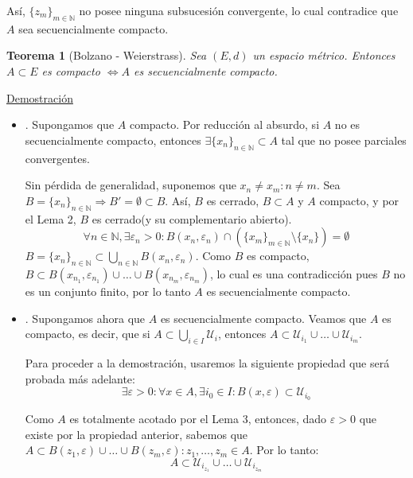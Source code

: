\documentclass[10pt,a4paper,openright]{book}
\theoremstyle{break}
\newtheorem*{theo}{Teorema}
\begin{document}
Así, $\{z_m\}_{m \in \mathbb{N}}$ no posee ninguna subsucesión convergente, lo cual contradice que $A$ sea secuencialmente compacto.

\begin{theo}[Bolzano - Weierstrass]
Sea $(E,d)$ un espacio métrico. Entonces $A \subset E$ es compacto $\Leftrightarrow A$ es secuencialmente compacto.
\end{theo}

\underline{Demostración}

\begin{itemize}
\item \fbox{$\Rightarrow$}. Supongamos que $A$ compacto. Por reducción al absurdo, si $A$ no es secuencialmente compacto, entonces $\exists \{x_n\}_{n \in \mathbb{N}} \subset A$ tal que no posee parciales convergentes.

Sin pérdida de generalidad, suponemos que $x_n \neq x_m : n \neq m$. Sea $B = \{x_n\}_{n \in \mathbb{N}} \Rightarrow B' = \emptyset \subset B$. Así, $B$ es cerrado, $B \subset A$ y $A$ compacto, y por el Lema 2, $B$ es cerrado(y su complementario abierto).
$$\forall n \in \mathbb{N}, \exists \varepsilon_n > 0 : B(x_n, \varepsilon_n) \cap \left( \{x_m\}_{m \in \mathbb{N}} \setminus \{x_n\}\right) = \emptyset$$
$B = \{x_n\}_{n \in \mathbb{N}}  \subset \bigcup_{n \in \mathbb{N}} B(x_n, \varepsilon_n)$. Como $B$ es compacto, $B \subset B(x_{n_1}, \varepsilon_{n_1}) \cup \ldots \cup B(x_{n_m}, \varepsilon_{n_m})$, lo cual es una contradicción pues $B$ no es un conjunto finito, por lo tanto $A$ es secuencialmente compacto.

\item \fbox{$\Leftarrow$}. Supongamos ahora que $A$ es secuencialmente compacto. Veamos que $A$ es compacto, es decir, que si $A \subset \bigcup_{i \in I} \mathcal{U}_i$, entonces $A \subset \mathcal{U}_{i_1} \cup \ldots \cup  \mathcal{U}_{i_m}$.

Para proceder a la demostración, usaremos la siguiente propiedad que será probada más adelante:
$$ \exists \varepsilon > 0 : \forall x \in A, \exists i_0 \in I : B(x, \varepsilon) \subset \mathcal{U}_{i_0}$$

Como $A$ es totalmente acotado por el Lema 3, entonces, dado $\varepsilon > 0$ que existe por la propiedad anterior, sabemos que $A \subset B(z_1, \varepsilon) \cup \ldots \cup B(z_m, \varepsilon) : z_1, \ldots, z_m \in A$. Por lo tanto:
$$A \subset \mathcal{U}_{i_{z_1}} \cup \ldots \cup \mathcal{U}_{i_{z_m}}$$
\end{itemize}
\end{document}
